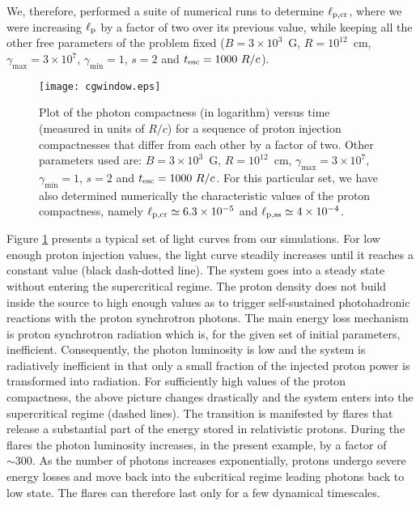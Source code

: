 \documentclass[fleqn,usenatbib]{mnras}
\newcommand{\tesc}{t_{\rm esc}}
\newcommand{\lp}{\ell_{\rm p}}
\newcommand{\lpcrss}{\ell_{\rm p, ss}}
\newcommand{\lpcr}{\ell_{\rm p,cr}}
\newcommand{\gmx}{\gamma_{\max}}
\newcommand{\gmn}{\gamma_{\min}}
\begin{document}
{We, therefore, performed a suite of numerical runs to determine $\lpcr$, where we were increasing $\lp$ by a factor of two over its previous value, while keeping all the other free parameters of the problem fixed ($B=3\times10^3$~G, $R=10^{12}$~cm, $\gmx=3\times10^7$,
$\gmn=1$, $s=2$  and $\tesc=1000\ R/c$). 
\begin{figure}
\centering
 \texttt{[image: cgwindow.eps]}
 \caption{Plot of the photon compactness (in logarithm) versus time (measured
 in units of $R/c$) for a sequence of proton injection compactnesses that 
 differ from each other by a factor of two. Other parameters used are: $B=3\times10^3$~G, $R=10^{12}$~cm, $\gmx=3\times10^7$,
$\gmn=1$, $s=2$  and $\tesc=1000\ R/c$. For this particular set, we have also determined numerically the characteristic values of the proton compactness, namely $\lpcr\simeq 6.3\times10^{-5}$ and $\lpcrss \simeq 4\times10^{-4}$.}
\label{Qcon}
\end{figure}
Figure \ref{Qcon} presents a typical set of light curves from our simulations. For low enough proton injection values, the light curve steadily increases until it reaches a constant value (black dash-dotted line).  The system goes into
a steady state without entering the supercritical regime. The proton density does not build inside the source to high enough values as to trigger self-sustained photohadronic reactions with the proton synchrotron photons. The main energy loss mechanism is proton synchrotron radiation which is, for the given set of initial parameters, inefficient. Consequently,  the photon luminosity is low and the system is radiatively inefficient in that only a small fraction of the injected proton power is transformed into radiation.  For sufficiently high values of the proton compactness, the  above picture changes drastically and the system enters into the supercritical regime (dashed lines). The transition is manifested by flares that release a substantial part of the energy stored in relativistic protons. During the flares the photon luminosity increases, in the present example, by a factor of $\sim300$. As the number of photons increases exponentially, protons undergo severe energy losses and move back into the subcritical regime leading photons back to low state. The flares can therefore last only for  a few dynamical timescales.

}
\end{document}
